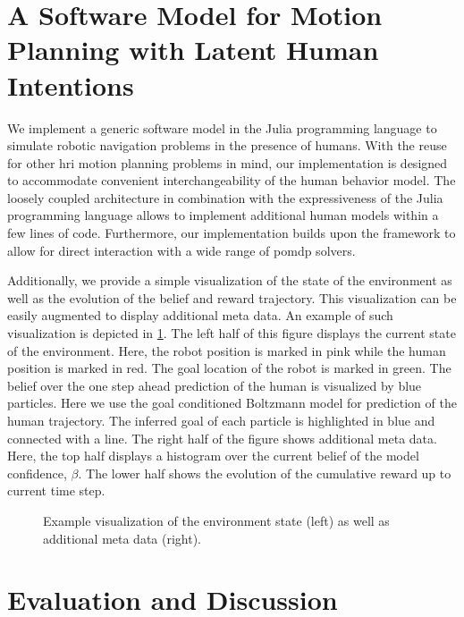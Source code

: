 \section{A Software Model for Motion Planning with Latent Human
Intentions}\label{sec:hri-software-model}

We implement a generic software model in the Julia programming language to
simulate robotic navigation problems in the presence of humans. With the reuse
for other \ac{hri} motion planning problems in mind, our implementation is
designed to accommodate convenient interchangeability of the human behavior
model. The loosely coupled architecture in combination with the expressiveness
of the Julia programming language allows to implement additional human models
within a few lines of code. Furthermore, our implementation builds upon the
\pomdpsjl framework to allow for direct interaction with a wide range of
\ac{pomdp} solvers.

Additionally, we provide a simple visualization of the state of the environment
as well as the evolution of the belief and reward trajectory. This
visualization can be easily augmented to display additional meta data. An
example of such visualization is depicted in \cref{fig:hri-software-model}. The
left half of this figure displays the current state of the environment. Here,
the robot position is marked in pink while the human position is marked in red.
The goal location of the robot is marked in green. The belief over the one step
ahead prediction of the human is visualized by blue particles. Here we
use the goal conditioned Boltzmann model for prediction of the human
trajectory. The inferred goal of each particle is highlighted in blue and
connected with a line. The right half of the figure shows additional meta data.
Here, the top half displays a histogram over the current belief of the model
confidence, $\beta$. The lower half shows the evolution of the cumulative
reward up to current time step.

\begin{figure}[htpb]
  \centering
  \caption{Example visualization of the environment state (left) as well as
           additional meta data (right).}
  \label{fig:hri-software-model}
\end{figure}

\section{Evaluation and Discussion}\label{sec:hri-evaluation}

